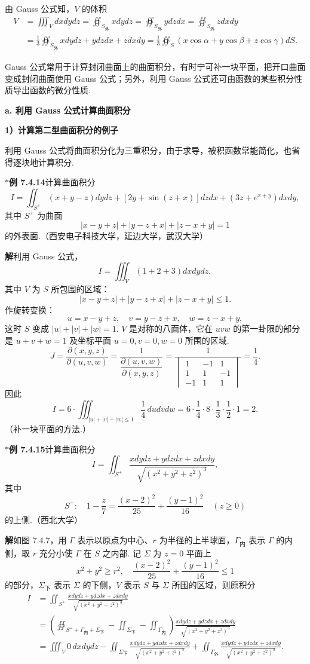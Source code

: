 \documentclass[UTF8,12pt,a4paper,fontset=fandol]{ctexart}
\begin{document}
由 Gauss 公式知，$V$ 的体积
\[
\begin{aligned}
V&=\iiint_Vdxdydz
=\oiint_{S_{\text{外}}}xdydz
=\oiint_{S_{\text{外}}}ydzdx
=\oiint_{S_{\text{外}}}zdxdy\\
&=\frac13\oiint_{S_{\text{外}}}xdydz+ydzdx+zdxdy
=\frac13\oiint_S(x\cos\alpha+y\cos\beta+z\cos\gamma)dS.
\end{aligned}
\]

Gauss 公式常用于计算封闭曲面上的曲面积分，有时宁可补一块平面，把开口曲面变成封闭曲面使用 Gauss 公式；另外，利用 Gauss 公式还可由函数的某些积分性质导出函数的微分性质.

\noindent\textbf{a. 利用 Gauss 公式计算曲面积分}

\noindent\textbf{1）计算第二型曲面积分的例子}

利用 Gauss 公式将曲面积分化为三重积分，由于求导，被积函数常能简化，也省得逐块地计算积分.

\noindent\textbf{$*$例 7.4.14}\quad 计算曲面积分
\[
I=\iint_{S^+}(x+y-z)dydz+[2y+\sin(z+x)]dzdx+(3z+e^{x+y})dxdy,
\]
其中 $S^+$ 为曲面
\[
|x-y+z|+|y-z+x|+|z-x+y|=1
\]
的外表面.（西安电子科技大学，延边大学，武汉大学）

\noindent\textbf{解}\quad 利用 Gauss 公式，
\[
I=\iiint_V(1+2+3)dxdydz,
\]
其中 $V$ 为 $S$ 所包围的区域：
\[
|x-y+z|+|y-z+x|+|z-x+y|\le1.
\]
作旋转变换：
\[
u=x-y+z,\quad v=y-z+x,\quad w=z-x+y,
\]
这时 $S$ 变成 $|u|+|v|+|w|=1$. $V$ 是对称的八面体，它在 $uvw$ 的第一卦限的部分是 $u+v+w=1$ 及坐标平面 $u=0,v=0,w=0$ 所围的区域.
\[
J=\frac{\partial(x,y,z)}{\partial(u,v,w)}
=\frac1{\dfrac{\partial(u,v,w)}{\partial(x,y,z)}}
=\frac1{\begin{vmatrix}
1&-1&1\\
1&1&-1\\
-1&1&1
\end{vmatrix}}
=\frac14.
\]
因此
\[
I=6\cdot\iiint_{|u|+|v|+|w|\le1}\frac14\,dudvdw
=6\cdot\frac14\cdot8\cdot\frac13\cdot\frac12\cdot1=2.
\]
（补一块平面的方法.）

\noindent\textbf{$*$例 7.4.15}\quad 计算曲面积分
\[
I=\iint_{S^+}\frac{xdydz+ydzdx+zdxdy}{\sqrt{(x^2+y^2+z^2)^3}},
\]
其中
\[
S^+:\quad 1-\frac z7=\frac{(x-2)^2}{25}+\frac{(y-1)^2}{16}\quad(z\ge0)
\]
的上侧.（西北大学）

\noindent\textbf{解}\quad 如图 7.4.7，用 $\Gamma$ 表示以原点为中心、$r$ 为半径的上半球面，$\Gamma_{\text{内}}$ 表示 $\Gamma$ 的内侧，取 $r$ 充分小使 $\Gamma$ 在 $S$ 之内部. 记 $\Sigma$ 为 $z=0$ 平面上
\[
x^2+y^2\ge r^2,\quad \frac{(x-2)^2}{25}+\frac{(y-1)^2}{16}\le1
\]
的部分，$\Sigma_{\text{下}}$ 表示 $\Sigma$ 的下侧，$V$ 表示 $S$ 与 $\Sigma$ 所围的区域，则原积分
\[
\begin{aligned}
I&=\iint_{S^+}\frac{xdydz+ydzdx+zdxdy}
{\sqrt{(x^2+y^2+z^2)^3}}\\
&=\left(\oiint_{S^++\Gamma_{\text{内}}+\Sigma_{\text{下}}}
-\iint_{\Sigma_{\text{下}}}-\iint_{\Gamma_{\text{内}}}\right)
\frac{xdydz+ydzdx+zdxdy}{\sqrt{(x^2+y^2+z^2)^3}}\\
&=\iiint_V0\,dxdydz
-\iint_{\Sigma_{\text{下}}}\frac{xdydz+ydzdx+zdxdy}
{\sqrt{(x^2+y^2+z^2)^3}}
+\iint_{\Gamma_{\text{外}}}\frac{xdydz+ydzdx+zdxdy}
{\sqrt{(x^2+y^2+z^2)^3}}.
\end{aligned}
\]
\end{document}
